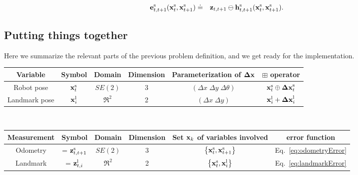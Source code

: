 \documentclass[a4paper]{article}
\begin{document}
\begin{eqnarray}
    \mathbf{e}^\mathrm{s}_{t,t+1}(\mathbf{x}^\mathrm{s}_t, \mathbf{x}^\mathrm{s}_{t+1})   & \doteq & \mathbf{z}_{t,t+1} \ominus \mathbf{h}^\mathrm{s}_{t,t+1}(\mathbf{x}^\mathrm{s}_t, \mathbf{x}^\mathrm{s}_{t+1}).
    \label{eq:odometryError}
\end{eqnarray}

\subsection{Putting things together}
Here we summarize the relevant parts of the previous problem definition,
and we get ready for the implementation.\\[.3em]
{\small
\begin{tabular}{|c|c|c|c|c|c|}
\hline
\textbf{Variable} & \textbf{Symbol}  & \textbf{Domain} & \textbf{Dimension} & \textbf{Parameterization of }$\mathbf{\Delta x}$   & $\boxplus$ \textbf{operator} \\
\hline
Robot    pose     & $\mathbf{x}^\mathrm{s}_t$ & $SE(2)$         & 3                  & $(\Delta x \; \Delta y \; \Delta\theta)$  & $\mathbf{x}^\mathrm{s}_t \oplus \mathbf{\Delta x}^\mathrm{s}_t$ \\
\hline
Landmark pose     & $\mathbf{x}^\mathrm{l}_i$ & $\Re^2$         & 2                  & $(\Delta x \; \Delta y )$                 & $\mathbf{x}^\mathrm{l}_i + \mathbf{\Delta x}^\mathrm{l}_i$\\
\hline
\end{tabular}\\[.3em]
\begin{tabular}{|c|c|c|c|c|c|}
\hline
\textbf{Measurement} & \textbf{Symbol}         & \textbf{Domain} & \textbf{Dimension} & \textbf{Set $\mathbf{x}_k$ of variables involved}             & \textbf{error function}\\
\hline
Odometry             & = $\mathbf{z}^\mathrm{s}_{t,t+1}$ & $SE(2)$         & 3                  & $\left\{ \mathbf{x}^\mathrm{s}_t, \mathbf{x}^\mathrm{s}_{t+1} \right\}$ & Eq.~\ref{eq:odometryError} \\
\hline
Landmark             & = $\mathbf{z}^\mathrm{l}_{t,i}$   & $\Re^2$         & 2                  & $\left\{ \mathbf{x}^\mathrm{s}_t, \mathbf{x}^\mathrm{l}_{i} \right\}$  & Eq.~\ref{eq:landmarkError} \\
\hline
\end{tabular}}\\[.3em]
\end{document}
